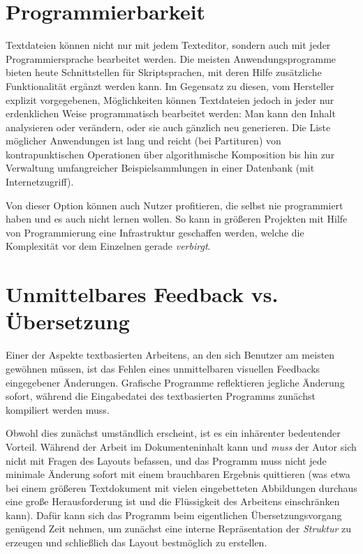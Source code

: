 \documentclass[DIV=12]{scrreprt}
\begin{document}
\section{Programmierbarkeit}
\label{sec:pt_programmability}
Textdateien können nicht nur mit jedem Texteditor, sondern auch mit jeder Programmiersprache bearbeitet werden.
Die meisten Anwendungsprogramme bieten heute Schnittstellen für Skriptsprachen, mit deren Hilfe zusätzliche Funktionalität ergänzt werden kann.
Im Gegensatz zu diesen, vom Hersteller explizit vorgegebenen, Möglichkeiten können Textdateien jedoch in jeder nur erdenklichen Weise programmatisch bearbeitet werden: Man kann den Inhalt analysieren oder verändern, oder sie auch gänzlich neu generieren.
Die Liste möglicher Anwendungen ist lang und reicht (bei Partituren) von kontrapunktischen Operationen über algorithmische Komposition bis hin zur Verwaltung umfangreicher Beispielsammlungen in einer Datenbank (mit Internetzugriff).

Von dieser Option können auch Nutzer profitieren, die selbst nie programmiert haben und es auch nicht lernen wollen.
So kann in größeren Projekten mit Hilfe von Programmierung eine Infrastruktur geschaffen werden, welche die Komplexität vor dem Einzelnen gerade \emph{verbirgt}.

\section{Unmittelbares Feedback vs. Übersetzung}
\label{sec:pt_compiling-instant}
Einer der Aspekte textbasierten Arbeitens, an den sich Benutzer am meisten gewöhnen müssen, ist das Fehlen eines unmittelbaren visuellen Feedbacks eingegebener Änderungen.
Grafische Programme reflektieren jegliche Änderung sofort, während die Eingabedatei des textbasierten Programms zunächst kompiliert werden muss.

Obwohl dies zunächst umständlich erscheint, ist es ein inhärenter bedeutender Vorteil.
Während der Arbeit im Dokumenteninhalt kann und \emph{muss} der Autor sich nicht mit Fragen des Layouts befassen, und das Programm muss nicht jede minimale Änderung sofort mit einem brauchbaren Ergebnis quittieren (was etwa bei einem größeren Textdokument mit vielen eingebetteten Abbildungen durchaus eine große Herausforderung ist und die Flüssigkeit des Arbeitens einschränken kann).
Dafür kann sich das Programm beim eigentlichen Übersetzungsvorgang genügend Zeit nehmen, um zunächst eine interne Repräsentation der \emph{Struktur} zu erzeugen und schließlich das Layout bestmöglich zu erstellen.
\end{document}
